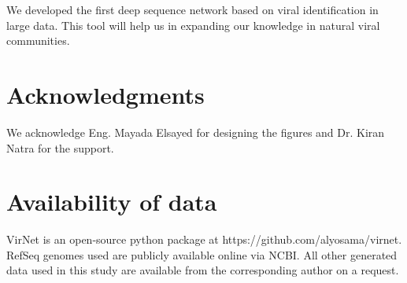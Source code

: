 \documentclass[conference]{IEEEtran}
\begin{document}
We developed the first deep sequence network based on viral identification in large data. This tool will help us in expanding our knowledge in natural viral communities.

\section*{Acknowledgments}

We acknowledge Eng. Mayada Elsayed for designing the figures and Dr. Kiran Natra for the support.  


\section*{Availability of data}

VirNet is an open-source python package at https://github.com/alyosama/virnet. 
RefSeq genomes used are publicly available online via NCBI. All other generated data used in this study are available from the corresponding author on a request. 




\end{document}
